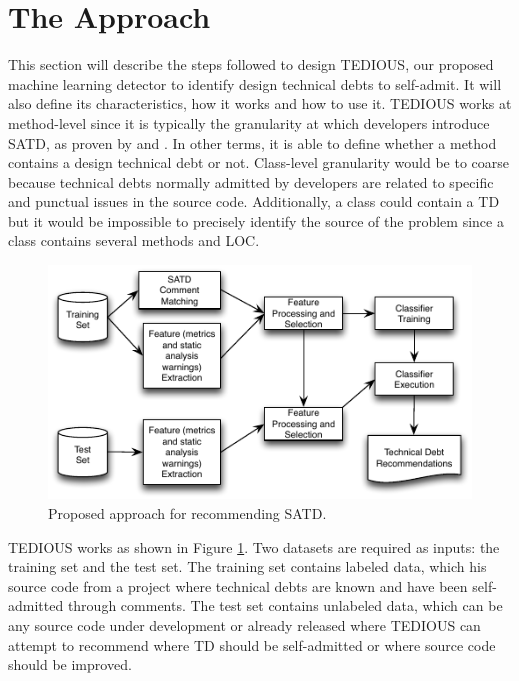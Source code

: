 \label{sec:Theme1}


\section{The Approach}


This section will describe the steps followed to design \ac{TEDIOUS}, our proposed machine learning detector to identify design technical debts to self-admit. It will also define its characteristics, how it works and how to use it. \ac{TEDIOUS} works at method-level since it is typically the granularity at which developers introduce \ac{SATD}, as proven by \citet{MaldonadoS15} and \citet{PotdarS14}. In other terms, it is able to define whether a method contains a design technical debt or not. Class-level granularity would be to coarse because technical debts normally admitted by developers are related to specific and punctual issues in the source code. Additionally, a class could contain a \ac{TD} but it would be impossible to precisely identify the source of the problem since a class contains several methods and \ac{LOC}. \par 

\begin{figure}[t]
	\centering
	\includegraphics[width=\linewidth]{figs/approach.pdf}
	\caption{Proposed approach for recommending SATD.}
	\label{fig:approach}
	\vspace{-4mm}
\end{figure}

\ac{TEDIOUS} works as shown in Figure \ref{fig:approach}. Two datasets are required as inputs: the training set and the test set. The training set contains labeled data, which his source code from a project where technical debts are known and have been self-admitted through comments. The test set contains unlabeled data, which can be any source code under development or already released where \ac{TEDIOUS} can attempt to recommend where \ac{TD} should be self-admitted or where source code should be improved. \par 
	
